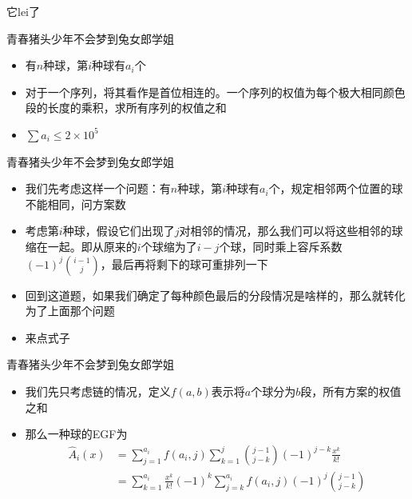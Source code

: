 \documentclass{beamer}
\begin{document}
\begin{frame}{它lei了}
    \begin{block}{青春猪头少年不会梦到兔女郎学姐}
        \begin{itemize}
            \item 有$n$种球，第$i$种球有$a_i$个
            \item 对于一个序列，将其看作是首位相连的。一个序列的权值为每个极大相同颜色段的长度的乘积，求所有序列的权值之和
            \item $\sum a_i\leq 2\times 10^5$
        \end{itemize}
    \end{block}
\end{frame}

\begin{frame}{青春猪头少年不会梦到兔女郎学姐}
    \begin{itemize}
        \item 我们先考虑这样一个问题：有$n$种球，第$i$种球有$a_i$个，规定相邻两个位置的球不能相同，问方案数 \pause
        \item 考虑第$i$种球，假设它们出现了$j$对相邻的情况，那么我们可以将这些相邻的球缩在一起。即从原来的$i$个球缩为了$i - j$个球，同时乘上容斥系数$(-1)^j{i - 1\choose j}$，最后再将剩下的球可重排列一下 \pause
        \item 回到这道题，如果我们确定了每种颜色最后的分段情况是啥样的，那么就转化为了上面那个问题 \pause
        \item 来点式子
    \end{itemize}
\end{frame}

\begin{frame}{青春猪头少年不会梦到兔女郎学姐}
    \begin{itemize}
        \item 我们先只考虑链的情况，定义$f(a, b)$表示将$a$个球分为$b$段，所有方案的权值之和 \pause
        \item 那么一种球的EGF为
        $$\begin{aligned}
            \hat A_i(x) &= \sum_{j = 1}^{a_i} f(a_i, j) \sum_{k = 1} ^ j{j - 1\choose j - k}(-1)^{j - k}\frac{x^k}{k!}\\
            &= \sum_{k = 1}^{a_i}\frac{x^k}{k!}(-1)^k \sum_{j = k}^{a_i} f(a_i, j)(-1)^j{j - 1\choose j - k}
        \end{aligned}$$
    \end{itemize}
\end{frame}
\end{document}
